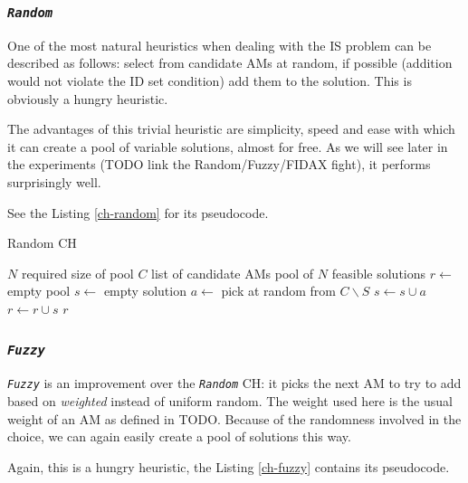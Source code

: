 \documentclass[a4paper,12pt,oneside]{report}
\newcommand{\jmodule}[1]{\texttt{\textit{#1}}}
\theoremstyle{definition}
\begin{document}
\subsubsection{\jmodule{Random}}
\label{heu-ch-random}

One of the most natural heuristics when dealing with the IS problem can be described as follows: select from candidate AMs at random, if possible (addition would not violate the ID set condition) add them to the solution. This is obviously a hungry heuristic. %

The advantages of this trivial heuristic are simplicity, speed and ease with which it can create a pool of variable solutions, almost for free. As we will see later in the experiments (TODO link the Random/Fuzzy/FIDAX fight), it performs surprisingly well.

See the Listing \ref{ch-random} for its pseudocode.

\begin{algorithm}
\caption{Random CH}
\label{ch-random}
\begin{algorithmic}
\REQUIRE $N$ required size of pool
\REQUIRE $C$ list of candidate AMs
\ENSURE pool of $N$ feasible solutions
\STATE $r \gets $ empty pool
  \STATE {}
  \STATE $s \gets $ empty solution
    \STATE $a \gets $ pick at random from $C \backslash S$
    \STATE $s \gets s \cup a$
  \ENDWHILE
  \STATE $r \gets r \cup s$
\ENDFOR
\RETURN $r$
\end{algorithmic}
\end{algorithm}

\subsubsection{\jmodule{Fuzzy}}
\label{heu-ch-fuzzy}

\jmodule{Fuzzy} is an improvement over the \jmodule{Random} CH: it picks the next AM to try to add based on \textit{weighted} instead of uniform random. The weight used here is the usual weight of an AM as defined in TODO. Because of the randomness involved in the choice, we can again easily create a pool of solutions this way. 

Again, this is a hungry heuristic, the Listing \ref{ch-fuzzy} contains its pseudocode.

\end{document}
